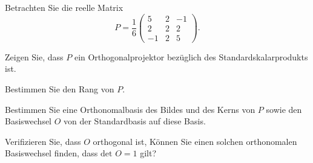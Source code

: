 \begin{Problem}
	Betrachten Sie die reelle Matrix
	\[
		P=\frac{1}{6}\begin{pmatrix} 5 & 2 & -1 \\ 2 & 2 & 2 \\ -1 & 2 & 5 \end{pmatrix} 
	.\] 
	\begin{parts}
	\item Zeigen Sie, dass $P$ ein Orthogonalprojektor bezüglich des Standardskalarprodukts ist.
	\item Bestimmen Sie den Rang von $P$.
	\item Bestimmen Sie eine Orthonomalbasis des Bildes und des Kerns von $P$ sowie den Basiswechsel $O$ von der Standardbasis auf diese Basis.
	\item Verifizieren Sie, dass $O$ orthogonal ist, Können Sie einen solchen orthonomalen Basiswechsel finden, dass $\text{det }O=1$ gilt?
	\end{parts}
\end{Problem}
